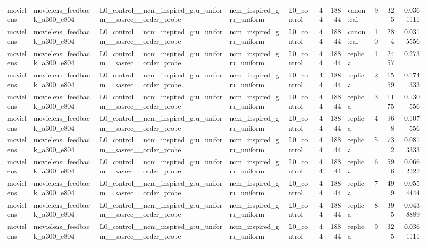 \begin{table}[htbp!]
\begin{tabular}{lllllrrlrrr}
movielens & movielens\_feedback\_a300\_e804 & L0\_control\_\_ncm\_inspired\_gru\_uniform\_\_sasrec\_\_order\_probe & ncm\_inspired\_gru\_uniform & L0\_control & 44 & 18844 & canonical & 9 & 325 & 0.0361111 \\
movielens & movielens\_feedback\_a300\_e804 & L0\_control\_\_ncm\_inspired\_gru\_uniform\_\_sasrec\_\_order\_probe & ncm\_inspired\_gru\_uniform & L0\_control & 44 & 18844 & canonical & 10 & 284 & 0.0315556 \\
movielens & movielens\_feedback\_a300\_e804 & L0\_control\_\_ncm\_inspired\_gru\_uniform\_\_sasrec\_\_order\_probe & ncm\_inspired\_gru\_uniform & L0\_control & 44 & 18844 & replica & 1 & 2457 & 0.273 \\
movielens & movielens\_feedback\_a300\_e804 & L0\_control\_\_ncm\_inspired\_gru\_uniform\_\_sasrec\_\_order\_probe & ncm\_inspired\_gru\_uniform & L0\_control & 44 & 18844 & replica & 2 & 1569 & 0.174333 \\
movielens & movielens\_feedback\_a300\_e804 & L0\_control\_\_ncm\_inspired\_gru\_uniform\_\_sasrec\_\_order\_probe & ncm\_inspired\_gru\_uniform & L0\_control & 44 & 18844 & replica & 3 & 1175 & 0.130556 \\
movielens & movielens\_feedback\_a300\_e804 & L0\_control\_\_ncm\_inspired\_gru\_uniform\_\_sasrec\_\_order\_probe & ncm\_inspired\_gru\_uniform & L0\_control & 44 & 18844 & replica & 4 & 968 & 0.107556 \\
movielens & movielens\_feedback\_a300\_e804 & L0\_control\_\_ncm\_inspired\_gru\_uniform\_\_sasrec\_\_order\_probe & ncm\_inspired\_gru\_uniform & L0\_control & 44 & 18844 & replica & 5 & 732 & 0.0813333 \\
movielens & movielens\_feedback\_a300\_e804 & L0\_control\_\_ncm\_inspired\_gru\_uniform\_\_sasrec\_\_order\_probe & ncm\_inspired\_gru\_uniform & L0\_control & 44 & 18844 & replica & 6 & 596 & 0.0662222 \\
movielens & movielens\_feedback\_a300\_e804 & L0\_control\_\_ncm\_inspired\_gru\_uniform\_\_sasrec\_\_order\_probe & ncm\_inspired\_gru\_uniform & L0\_control & 44 & 18844 & replica & 7 & 499 & 0.0554444 \\
movielens & movielens\_feedback\_a300\_e804 & L0\_control\_\_ncm\_inspired\_gru\_uniform\_\_sasrec\_\_order\_probe & ncm\_inspired\_gru\_uniform & L0\_control & 44 & 18844 & replica & 8 & 395 & 0.0438889 \\
movielens & movielens\_feedback\_a300\_e804 & L0\_control\_\_ncm\_inspired\_gru\_uniform\_\_sasrec\_\_order\_probe & ncm\_inspired\_gru\_uniform & L0\_control & 44 & 18844 & replica & 9 & 325 & 0.0361111 \\

\end{tabular}
\end{table}
